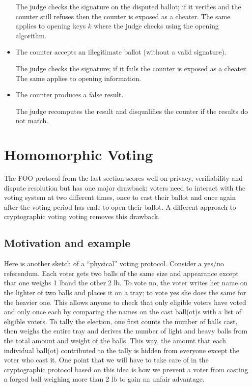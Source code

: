 \documentclass{llncs}
\begin{document}
\begin{itemize}
The judge checks the signature on the disputed ballot; if it verifies and the
counter still refuses then the counter is exposed as a cheater. The same applies
to opening keys $k$ where the judge checks using the opening algorithm.

\item The counter accepts an illegitimate ballot (without a valid signature).

The judge checks the signature; if it fails the counter is exposed as a cheater.
The same applies to opening information.

\item The counter produces a false result.

The judge recomputes the result and disqualifies the counter if the results do
not match.
\end{itemize}

\section{Homomorphic Voting}

The FOO protocol from the last section scores well on privacy, verifiability and
dispute resolution but has one major drawback: voters need to interact with the
voting system at two different times, once to cast their ballot and once again
after the voting period has ende to open their ballot. A different approach to
cryptographic voting voting removes this drawback.

\subsection{Motivation and example}

Here is another sketch of a ``physical'' voting protocol. Consider a yes/no
referendum. Each voter gets two balls of the same size and appearance except
that one weighs 1 lb\footnotemark and the other 2 lb. To vote no, the voter
writes her name on the lighter of two balls and places it on a tray; to vote yes
she does the same for the heavier one. This allows anyone to check that only
eligible voters have voted and only once each by comparing the names on the cast
ball(ot)s with a list of eligible voters. To tally the election, one first
counts the number of balls cast, then weighs the entire tray and derives the
number of light and heavy balls from the total amount and weight of the balls.
This way, the amount that each individual ball(ot) contributed to the tally is
hidden from everyone except the voter who cast it. One point that we will have
to take care of in the cryptographic protocol based on this idea is how we
prevent a voter from casting a forged ball weighing more than 2 lb to gain an
unfair advantage.
\end{document}
